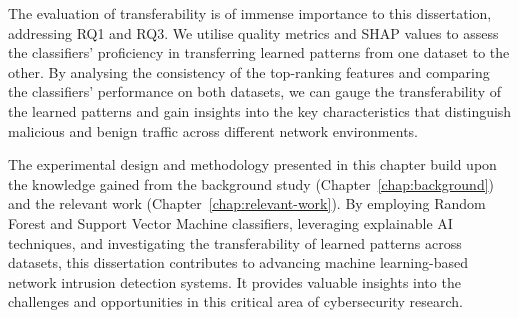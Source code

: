 The evaluation of transferability is of immense importance to this dissertation, addressing RQ1 and RQ3. We utilise quality metrics and SHAP values to assess the classifiers' proficiency in transferring learned patterns from one dataset to the other. By analysing the consistency of the top-ranking features and comparing the classifiers' performance on both datasets, we can gauge the transferability of the learned patterns and gain insights into the key characteristics that distinguish malicious and benign traffic across different network environments.

The experimental design and methodology presented in this chapter build upon the knowledge gained from the background study (Chapter~\ref{chap:background}) and the relevant work (Chapter~\ref{chap:relevant-work}). By employing Random Forest and Support Vector Machine classifiers, leveraging explainable AI techniques, and investigating the transferability of learned patterns across datasets, this dissertation contributes to advancing machine learning-based network intrusion detection systems. It provides valuable insights into the challenges and opportunities in this critical area of cybersecurity research.